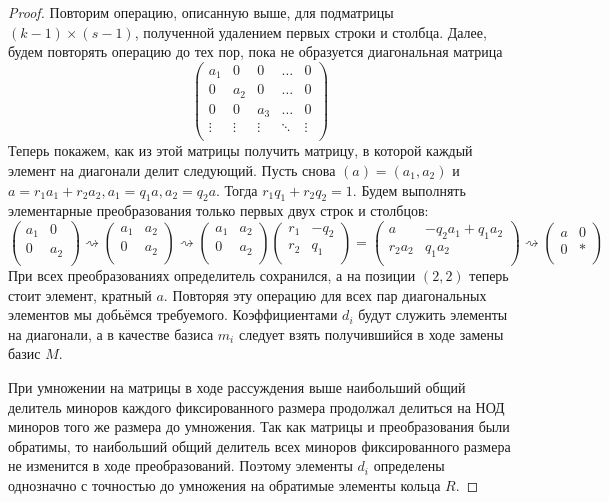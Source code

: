 \begin{proof}
	Повторим операцию, описанную выше, для подматрицы $ (k - 1) \times (s - 1) $,
	полученной удалением первых строки и столбца.
	Далее, будем повторять операцию до тех пор, пока не образуется диагональная матрица
	$$ \begin{pmatrix}
	a_1 & 0 & 0 & \ldots & 0 \\
	0 & a_2  & 0 & \ldots & 0 \\
	0   & 0    & a_3 & \ldots & 0 \\
	\vdots & \vdots & \vdots & \ddots & \vdots \\
	\end{pmatrix} $$
	Теперь покажем, как из этой матрицы получить матрицу, 
	в которой каждый элемент на диагонали делит следующий.
	Пусть снова $ (a) = (a_{1}, a_2) $ и $ a = r_1a_1 + r_2a_2, a_1 = q_1a, a_2 = q_2a $.
	Тогда $ r_1q_1 + r_2q_2 = 1 $. 
	Будем выполнять элементарные преобразования только первых двух строк и столбцов:
	$$ \begin{pmatrix}
	a_1 & 0  \\
	0 & a_2   \\
	\end{pmatrix}
	\rightsquigarrow
	\begin{pmatrix}
		a_1 & a_2  \\
		0 & a_2   \\
	\end{pmatrix}
	\rightsquigarrow
	\begin{pmatrix}
	a_1 & a_2  \\
	0 & a_2   \\
	\end{pmatrix}
	\begin{pmatrix}
	r_1 & -q_2  \\
	r_2 & q_1   \\
	\end{pmatrix}
	=
	\begin{pmatrix}
	a & -q_2a_1 + q_1a_2  \\
	r_2a_2 & q_1a_2   \\
	\end{pmatrix}
	\rightsquigarrow
	\begin{pmatrix}
	a & 0  \\
	0 & *   \\
	\end{pmatrix} $$
	При всех преобразованиях определитель сохранился, а на позиции $ (2, 2) $ теперь стоит элемент, кратный $ a $.
	Повторяя эту операцию для всех пар диагональных элементов мы добьёмся требуемого.
	Коэффициентами $ d_i $ будут служить элементы на диагонали, а в качестве базиса $ m_i $
	следует взять получившийся в ходе замены базис $ M $.
	
	При умножении на матрицы в ходе рассуждения выше 
	наибольший общий делитель миноров каждого фиксированного размера 
	продолжал делиться на НОД миноров того же размера до умножения.
	Так как матрицы и преобразования были обратимы, 
	то наибольший общий делитель всех миноров фиксированного размера 
	не изменится в ходе преобразований.
	Поэтому элементы $ d_i $ определены однозначно с точностью до умножения на обратимые элементы кольца $ R $.
\end{proof}

